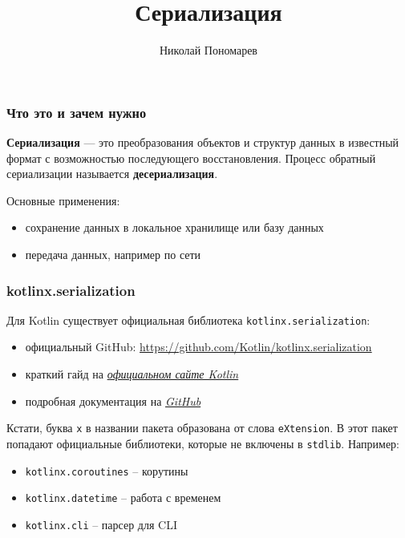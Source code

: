 \documentclass[aspectratio=169]{beamer}
\title{Сериализация}
\author{Николай Пономарев}
\date{}
\begin{document}
\begin{frame}[plain]
    \maketitle
\end{frame}

\begin{frame}
    \frametitle{Что это и зачем нужно}
    \textbf{Сериализация} --- это преобразования объектов и структур данных в известный формат с возможностью последующего восстановления.
    Процесс обратный сериализации называется \textbf{десериализация}.

    Основные применения:
    \begin{itemize}
        \item сохранение данных в локальное хранилище или базу данных
        \item передача данных, например по сети
    \end{itemize}
\end{frame}

\begin{frame}
    \frametitle{kotlinx.serialization}
    Для Kotlin существует официальная библиотека \texttt{kotlinx.serialization}:
    \begin{itemize}
        \item официальный GitHub: \url{https://github.com/Kotlin/kotlinx.serialization}
        \item краткий гайд на \href{https://kotlinlang.org/docs/serialization.html}{\textit{официальном сайте Kotlin}}
        \item подробная документация на \href{https://github.com/Kotlin/kotlinx.serialization/blob/master/docs/serialization-guide.md}{\textit{GitHub}}
    \end{itemize}
    Кстати, буква \texttt{x} в названии пакета образована от слова \texttt{eXtension}.
    В этот пакет попадают официальные библиотеки, которые не включены в \texttt{stdlib}.
    Например:
    \begin{itemize}
        \item \texttt{kotlinx.coroutines} -- корутины
        \item \texttt{kotlinx.datetime} -- работа с временем
        \item \texttt{kotlinx.cli} -- парсер для CLI
    \end{itemize}
\end{frame}
\end{document}
